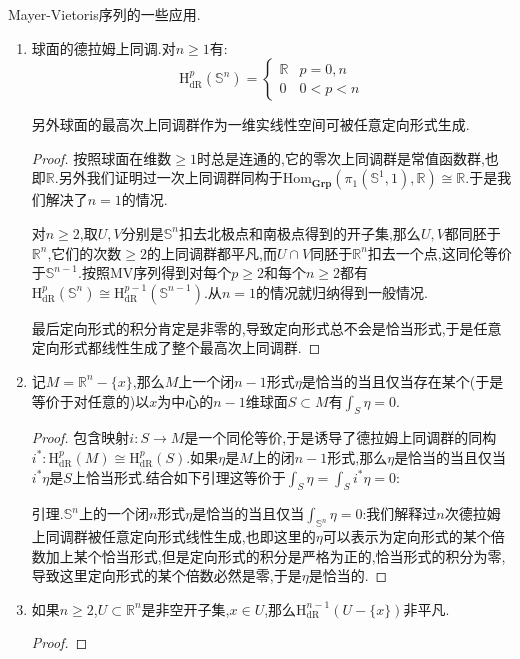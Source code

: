 Mayer-Vietoris序列的一些应用.
\begin{enumerate}
	\item 球面的德拉姆上同调.对$n\ge1$有:
	$$\mathrm{H}^p_{\mathrm{dR}}(\mathbb{S}^n)=\left\{\begin{array}{cc}\mathbb{R}&p=0,n\\0&0<p<n\end{array}\right.$$
	
	另外球面的最高次上同调群作为一维实线性空间可被任意定向形式生成.
	\begin{proof}
		
		按照球面在维数$\ge1$时总是连通的,它的零次上同调群是常值函数群,也即$\mathbb{R}$.另外我们证明过一次上同调群同构于$\mathrm{Hom}_{\textbf{Grp}}(\pi_1(\mathbb{S}^1,1),\mathbb{R})\cong\mathbb{R}$.于是我们解决了$n=1$的情况.
		
		对$n\ge2$,取$U,V$分别是$\mathbb{S}^n$扣去北极点和南极点得到的开子集,那么$U,V$都同胚于$\mathbb{R}^n$,它们的次数$\ge2$的上同调群都平凡,而$U\cap V$同胚于$\mathbb{R}^n$扣去一个点,这同伦等价于$\mathbb{S}^{n-1}$.按照MV序列得到对每个$p\ge2$和每个$n\ge2$都有$\mathrm{H}^p_{\mathrm{dR}}(\mathbb{S}^n)\cong\mathrm{H}^{p-1}_{\mathrm{dR}}(\mathbb{S}^{n-1})$.从$n=1$的情况就归纳得到一般情况.
		
		最后定向形式的积分肯定是非零的,导致定向形式总不会是恰当形式,于是任意定向形式都线性生成了整个最高次上同调群.
	\end{proof}
    \item 记$M=\mathbb{R}^n-\{x\}$,那么$M$上一个闭$n-1$形式$\eta$是恰当的当且仅当存在某个(于是等价于对任意的)以$x$为中心的$n-1$维球面$S\subset M$有$\int_S\eta=0$.
    \begin{proof}
    	
    	包含映射$i:S\to M$是一个同伦等价,于是诱导了德拉姆上同调群的同构$i^*:\mathrm{H}^p_{\mathrm{dR}}(M)\cong\mathrm{H}^p_{\mathrm{dR}}(S)$.如果$\eta$是$M$上的闭$n-1$形式,那么$\eta$是恰当的当且仅当$i^*\eta$是$S$上恰当形式.结合如下引理这等价于$\int_S\eta=\int_Si^*\eta=0$:
    	
    	引理.$\mathbb{S}^n$上的一个闭$n$形式$\eta$是恰当的当且仅当$\int_{\mathbb{S}^n}\eta=0$:我们解释过$n$次德拉姆上同调群被任意定向形式线性生成,也即这里的$\eta$可以表示为定向形式的某个倍数加上某个恰当形式,但是定向形式的积分是严格为正的,恰当形式的积分为零,导致这里定向形式的某个倍数必然是零,于是$\eta$是恰当的.
    \end{proof}
    \item 如果$n\ge2$,$U\subset\mathbb{R}^n$是非空开子集,$x\in U$,那么$\mathrm{H}^{n-1}_{\mathrm{dR}}(U-\{x\})$非平凡.
    \begin{proof}
    	

\end{proof}
\end{enumerate}
